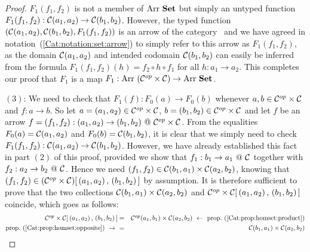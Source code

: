 \begin{proof}
    $F_{1}(f_{1},f_{2})$ is not a member of $\mbox{\rm Arr}\ \mbox{\bf Set}$ but simply an untyped 
    function $F_{1}(f_{1},f_{2}): \mbox{$\cal C$}(a_{1},a_{2})\to\mbox{$\cal C$}(b_{1},b_{2})$. 
    However, the typed function
    $(\mbox{$\cal C$}(a_{1},a_{2}),\mbox{$\cal C$}(b_{1},b_{2}),F_{1}(f_{1},f_{2}))$ is an arrow
    of the category \Set\ and we have agreed in 
    notation~(\ref{Cat:notation:set:arrow}) to simply refer to this arrow as
    $F_{1}(f_{1},f_{2})$, as the domain $\mbox{$\cal C$}(a_{1},a_{2})$ and intended
    codomain $\mbox{$\cal C$}(b_{1},b_{2})$ can easily be inferred from the formula
    $F_{1}(f_{1},f_{2})(h) = f_{2}\circ h\circ f_{1}$ for all $h:a_{1}\to 
    a_{2}$. This completes our proof that $F_{1}$ is a map $F_{1}:
    \mbox{\rm Arr}\ (\mbox{${\cal C}^{op}$}\times\mbox{$\cal C$})\to\mbox{\rm Arr}\ \mbox{\bf Set}$.

    $(3)$: We need to check that $F_{1}(f):F_{0}(a)\to F_{0}(b)$ whenever
    $a,b\in\mbox{${\cal C}^{op}$}\times\mbox{$\cal C$}$ and $f:a\to b$. So let $a=(a_{1},a_{2})\in\mbox{${\cal C}^{op}$}
    \times\mbox{$\cal C$}$, $b=(b_{1},b_{2})\in\mbox{${\cal C}^{op}$}\times\mbox{$\cal C$}$ and let $f$ be an 
    arrow $f=(f_{1},f_{2}):(a_{1},a_{2})\to(b_{1},b_{2})\ @\ \Cop\times\Cat$. 
    From the equalities $F_{0}(a)=\mbox{$\cal C$}(a_{1},a_{2})$ and $F_{0}(b)=\mbox{$\cal C$}
    (b_{1},b_{2})$, it is clear that we simply need to check 
    $F_{1}(f_{1},f_{2}):\mbox{$\cal C$}(a_{1},a_{2})\to \mbox{$\cal C$}(b_{1},b_{2})$.
    However, we have already established this fact in part $(2)$ of this 
    proof, provided we show that $f_{1}:b_{1}\to a_{1}\ @\ \mbox{$\cal C$}$ together 
    with $f_{2}:a_{2}\to b_{2}\ @\ \mbox{$\cal C$}$. Hence we need
    $(f_{1},f_{2})\in\mbox{$\cal C$}(b_{1},a_{1})\times\mbox{$\cal C$}(a_{2},b_{2})$, knowing
    that $(f_{1},f_{2})\in(\mbox{${\cal C}^{op}$}\times\mbox{$\cal C$})[\,(a_{1},a_{2})\,,\,(b_{1},b_{2})
    \,]$ by assumption. It is therefore sufficient to prove that the 
    two collections $\mbox{$\cal C$}(b_{1},a_{1})\times\mbox{$\cal C$}(a_{2},b_{2})$ and
    $\mbox{${\cal C}^{op}$}\times\mbox{$\cal C$}[\,(a_{1},a_{2})\,,\,(b_{1},b_{2})\,]$ coincide, which 
    goes as follows:
        \begin{eqnarray*}\Cop\times\Cat[\,(a_{1},a_{2})\,,\,(b_{1},b_{2})\,]
            &=&\Cop(a_{1},b_{1})\times\Cat(a_{2},b_{2})\ \leftarrow\ 
            \mbox{prop.~(\ref{Cat:prop:homset:product})}\\
            \mbox{prop.~(\ref{Cat:prop:homset:opposite})}\ \to\ 
            &=&\Cat(b_{1},a_{1})\times\Cat(a_{2},b_{2})
        \end{eqnarray*}


\end{proof}

